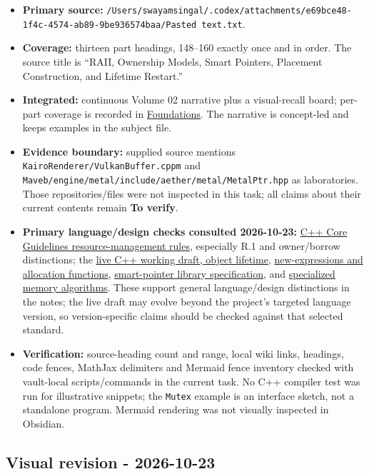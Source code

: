 \begin{itemize}
\tightlist
\item
  \textbf{Primary source:} \texttt{/Users/swayamsingal/.codex/attachments/e69bce48-1f4c-4574-ab89-9be936574baa/Pasted\ text.txt}.
\item
  \textbf{Coverage:} thirteen part headings, 148--160 exactly once and in order. The source title is ``RAII, Ownership Models, Smart Pointers, Placement Construction, and Lifetime Restart.''
\item
  \textbf{Integrated:} continuous Volume 02 narrative plus a visual-recall board; per-part coverage is recorded in \hyperref[appendix-fd090d982a15-m010---parts-148-160]{Foundations}. The narrative is concept-led and keeps examples in the subject file.
\item
  \textbf{Evidence boundary:} supplied source mentions \texttt{KairoRenderer/VulkanBuffer.cppm} and \texttt{Maveb/engine/metal/include/aether/metal/MetalPtr.hpp} as laboratories. Those repositories/files were not inspected in this task; all claims about their current contents remain \textbf{To verify}.
\item
  \textbf{Primary language/design checks consulted 2026-10-23:} \href{https://isocpp.github.io/CppCoreGuidelines/CppCoreGuidelines\#S-resource}{C++ Core Guidelines resource-management rules}, especially R.1 and owner/borrow distinctions; the \href{https://eel.is/c++draft/basic.life}{live C++ working draft, object lifetime}, \href{https://eel.is/c++draft/expr.new}{new-expressions and allocation functions}, \href{https://eel.is/c++draft/util.smartptr}{smart-pointer library specification}, and \href{https://eel.is/c++draft/specialized.algorithms}{specialized memory algorithms}. These support general language/design distinctions in the notes; the live draft may evolve beyond the project's targeted language version, so version-specific claims should be checked against that selected standard.
\item
  \textbf{Verification:} source-heading count and range, local wiki links, headings, code fences, MathJax delimiters and Mermaid fence inventory checked with vault-local scripts/commands in the current task. No C++ compiler test was run for illustrative snippets; the \texttt{Mutex} example is an interface sketch, not a standalone program. Mermaid rendering was not visually inspected in Obsidian.
\end{itemize}

\subsection{Visual revision - 2026-10-23}\label{appendix-a103e7846d21-visual-revision---2026-10-23}

